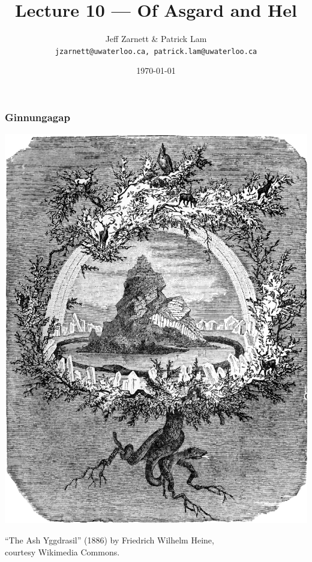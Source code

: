 

\title{Lecture 10 --- Of Asgard and Hel }

\author{Jeff Zarnett \& Patrick Lam \\ \small \texttt{jzarnett@uwaterloo.ca, patrick.lam@uwaterloo.ca}}
\date{\today}




\begin{frame}
  \titlepage

 \end{frame}

\begin{frame}
\frametitle{Ginnungagap}

\begin{center}
\includegraphics[height=.8\textheight]{images/L10-yggdrasil.jpg}

``The Ash Yggdrasil'' (1886) by Friedrich Wilhelm Heine, \\
courtesy Wikimedia Commons.
\end{center}





\end{frame}

